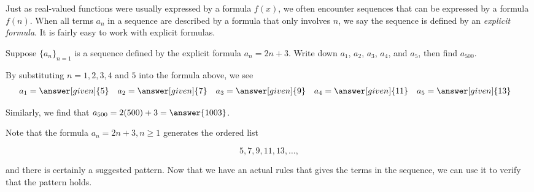\documentclass{ximera}
\begin{document}
Just as real-valued functions were usually expressed by a formula $f(x)$, we often encounter sequences that can be expressed by a formula $f(n)$.  When all terms $a_n$ in a sequence are described by a formula that only involves $n$, we say the sequence is defined by an \emph{explicit formula}. It is fairly easy to work with explicit formulas.

\begin{example}
Suppose $\{a_n\}_{n=1}$ is a sequence defined by the explicit formula $a_n = 2n+3$.  Write down $a_1$, $a_2$, $a_3$, $a_4$, and $a_5$, then find $a_{500}$.

  \begin{explanation}
    By substituting $n=1, 2, 3, 4$ and $5$ into the formula above, we see
    \begin{align*}
      a_1 &= \answer[given]{5} & 
      a_2 &= \answer[given]{7} & 
      a_3 &= \answer[given]{9} & 
      a_4 &= \answer[given]{11} & 
      a_5 &= \answer[given]{13} 
    \end{align*}

Similarly, we find that $a_{500} = 2(500)+3 = \answer{1003}$.

\end{explanation}

Note that the formula $a_n = 2n+3, n \geq 1$ generates the ordered list 

\[
5,7,9,11,13, \dots ,
\]   

and there is certainly a suggested pattern. Now that we have an actual rules that gives the terms in the sequence, we can use it to verify that the pattern holds.
  
\end{example}




%
%  
\end{document}
